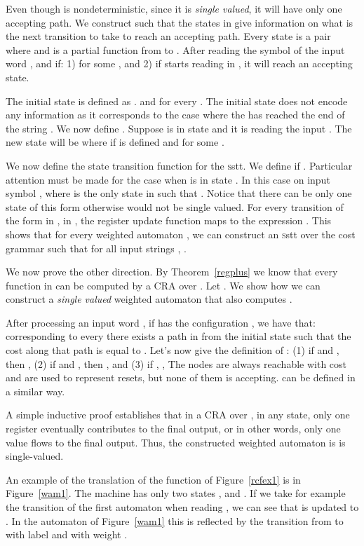 \documentclass[11pt]{article}
\def\qed{{\bf }}
\def\qed{{\bf }}
\newcommand{\SSTT}{{\sc\textsc sstt}\xspace}
\newcommand{\EDWA}{{CRA}\xspace}
\begin{document}
Even though  is nondeterministic, since it is \emph{single
valued}, it will have only one accepting path.  We construct
 such that the states in  give information on
what is the next transition to take to reach an accepting path.  Every
state  is a pair  where
 and  is a partial function
from  to . After reading the  symbol of
the input word ,  and  if:
1)  for some , and
2) if  starts reading  in , it will reach an accepting state.

The initial state  is defined as .  and for
every  . The initial state does not encode
any information as it corresponds to the case where the  has
reached the end of the string .  We now define . Suppose
 is in state  and it is reading the input . The new state
will be  where  if  is defined and
 for some .

We now define the state transition function for the \SSTT . We
define  if .  Particular attention must
be made for the case when  is in state .  In this
case on input symbol ,  where 
is the only state in  such that . Notice that
there can be only one state of this form otherwise  would not be
single valued.  For every transition of the form  in
, in , the register update function  maps 
to the expression . This shows that for every weighted
automaton , we can construct an \SSTT  over the cost
grammar  such that for all input strings ,
.

We now prove the other direction.  By Theorem~\ref{regplus} we know
that every function  in  can be computed
by a \EDWA  over . Let
.
We show how we can construct a \emph{single valued} weighted automaton
 that
also computes .

After processing an input word , if  has the configuration
, we have that: corresponding to every  there exists a path in  from the initial state such that the
cost along that path is equal to .  Let's now give the
definition of :
(1) if  and , then ,
(2) if  and , then , and
(3) if , ,
The nodes  are always reachable with cost  and are used to
represent resets, but none of them is accepting.  can be
defined in a similar way.

A simple inductive proof establishes that in a \EDWA over
, in any state, only one register eventually
contributes to the final output, or in other words, only one value
flows to the final output. Thus, the constructed weighted automaton is
is single-valued.
\qed

An example of the translation of the function  of
Figure~\ref{rcfex1} is in Figure~\ref{wam1}. The machine has only two
states , and . If we take for example the transition
of the first automaton when reading , we can see that  is
updated to . In the automaton of Figure~\ref{wam1} this is
reflected by the transition from  to  with label 
and with weight .
\end{document}
